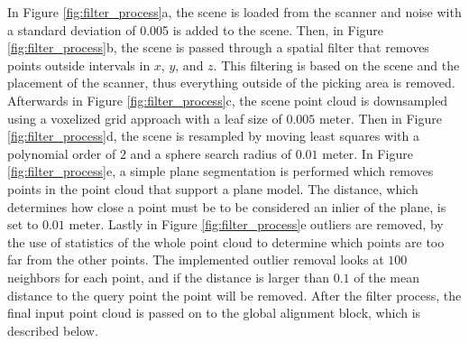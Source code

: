 \documentclass[../main.tex]{subfiles}
\begin{document}
In Figure \ref{fig:filter_process}a, the scene is loaded from the scanner and noise with a standard deviation of 0.005 is added to the scene. Then, in Figure \ref{fig:filter_process}b, the scene is passed through a spatial filter that removes points outside intervals in $x$, $y$, and $z$. This filtering is based on the scene and the placement of the scanner, thus everything outside of the picking area is removed. Afterwards in Figure \ref{fig:filter_process}c, the scene point cloud is downsampled using a voxelized grid approach with a leaf size of $0.005$ meter. Then in Figure \ref{fig:filter_process}d, the scene is resampled by moving least squares with a polynomial order of $2$ and a sphere search radius of $0.01$ meter. In Figure \ref{fig:filter_process}e, a simple plane segmentation is performed which removes points in the point cloud that support a plane model. The distance, which determines how close a point must be to be considered an inlier of the plane, is set to $0.01$ meter. Lastly in Figure \ref{fig:filter_process}e outliers are removed, by the use of statistics of the whole point cloud to determine which points are too far from the other points. The implemented outlier removal looks at $100$ neighbors for each point, and if the distance is larger than $0.1$ of the mean distance to the query point the point will be removed. After the filter process, the final input point cloud is passed on to the global alignment block, which is described below.
\end{document}
